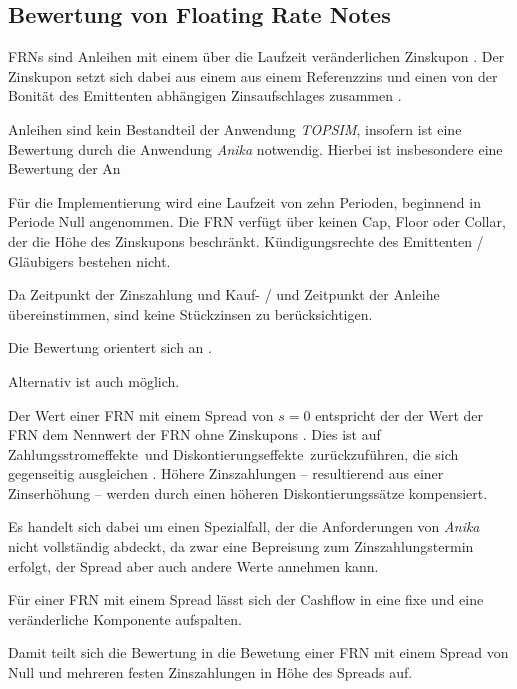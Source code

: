 \documentclass[12pt, a4paper]{article}
\theoremstyle{plain}
\begin{document}
\subsection{Bewertung von Floating Rate Notes}
\label{sec:bewertung_von_floating_rate_notes}
\glspl{FRN} sind Anleihen mit einem über die Laufzeit veränderlichen Zinskupon \autocite[][373]{fabozzi_handbook_2005}. Der Zinskupon setzt sich dabei aus einem aus einem Referenzzins und einen von der Bonität des Emittenten abhängigen Zinsaufschlages zusammen \autocite[][374]{fabozzi_handbook_2005}.

Anleihen sind kein Bestandteil der Anwendung \textit{TOPSIM}, insofern ist eine Bewertung durch die Anwendung \textit{Anika} notwendig.
Hierbei ist insbesondere eine Bewertung der An

Für die Implementierung wird eine Laufzeit von zehn Perioden, beginnend in Periode Null angenommen.
Die \gls{FRN} verfügt über keinen Cap, Floor oder Collar, der die Höhe des Zinskupons beschränkt.
Kündigungsrechte des Emittenten / Gläubigers bestehen nicht.

Da Zeitpunkt der Zinszahlung und Kauf- / und Zeitpunkt der Anleihe übereinstimmen, sind keine Stückzinsen zu berücksichtigen.

Die Bewertung orientert sich an \autocite[][]{veronesi_fixed_2010}.


Alternativ ist auch \autocite[][]{fabozzi_handbook_2005} möglich.

Der Wert einer \gls{FRN} mit einem Spread von $s=0$ entspricht der der Wert der \gls{FRN} dem Nennwert der \gls{FRN} ohne Zinskupons \autocite[][S.~52~f.]{veronesi_fixed_2010}. Dies ist auf \glqq Zahlungsstromeffekte\grqq~und \glqq Diskontierungseffekte\grqq~zurückzuführen, die sich gegenseitig ausgleichen \autocite[][S.~54]{veronesi_fixed_2010}. Höhere Zinszahlungen -- resultierend aus einer Zinserhöhung -- werden durch einen höheren Diskontierungssätze kompensiert.

Es handelt sich dabei um einen Spezialfall, der die Anforderungen von \textit{Anika} nicht vollständig abdeckt, da zwar eine Bepreisung zum Zinszahlungstermin erfolgt, der Spread aber auch andere Werte annehmen kann.

Für einer \gls{FRN} mit einem Spread lässt sich der Cashflow in eine fixe und eine veränderliche Komponente aufspalten.

Damit teilt sich die Bewertung in die Bewetung einer \gls{FRN} mit einem Spread von Null und mehreren festen Zinszahlungen in Höhe des Spreads auf.
\end{document}
